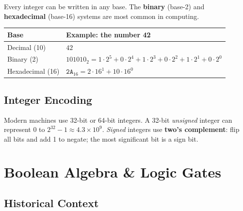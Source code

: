 \documentclass[oneside]{book}
\begin{document}
Every integer can be written in any base.  The \textbf{binary} (base-2) and
\textbf{hexadecimal} (base-16) systems are most common in computing.

\begin{center}
\begin{tabularx}{0.72\linewidth}{lX}
\toprule
\textbf{Base} & \textbf{Example: the number 42} \\
\midrule
Decimal (10)     & $42$ \\
Binary (2)       & $101010_2 = 1\cdot2^5+0\cdot2^4+1\cdot2^3+0\cdot2^2+1\cdot2^1+0\cdot2^0$ \\
Hexadecimal (16) & $\texttt{2A}_{16} = 2\cdot16^1 + 10\cdot16^0$ \\
\bottomrule
\end{tabularx}
\end{center}


\subsection*{Integer Encoding}

Modern machines use 32-bit or 64-bit integers.  A 32-bit \emph{unsigned} integer
can represent $0$ to $2^{32}-1 \approx 4.3\times10^9$.  \emph{Signed} integers use
\textbf{two's complement}: flip all bits and add 1 to negate; the most significant
bit is a sign bit.


\section{Boolean Algebra \& Logic Gates}

\subsection*{Historical Context}
\end{document}
